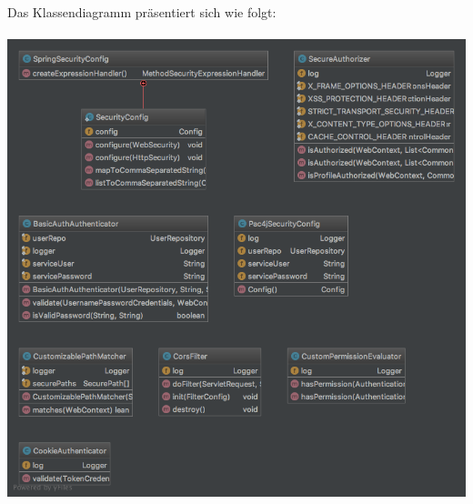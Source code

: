 \documentclass[11pt]{article} %
\begin{document}
\leavevmode \\
Das Klassendiagramm präsentiert sich wie folgt:
\\
\\
\includegraphics[width=1.0\textwidth]{class-diagrams/Eventmanagement-Security}
\\
\\
\end{document}

